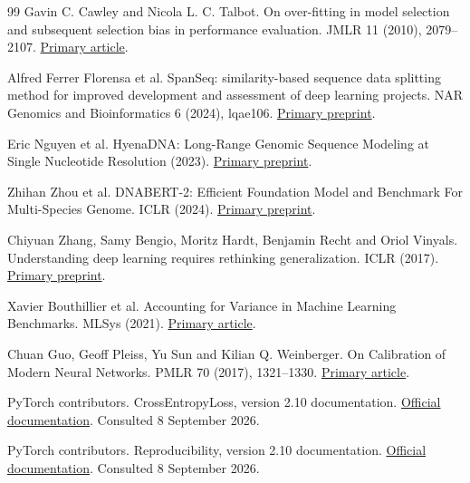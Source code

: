 \begin{thebibliography}{99}
 Gavin C. Cawley and Nicola L. C. Talbot. On over-fitting in model selection and subsequent selection bias in performance evaluation. JMLR 11 (2010), 2079--2107. \href{https://jmlr.org/papers/v11/cawley10a.html}{Primary article}.

 Alfred Ferrer Florensa et al. SpanSeq: similarity-based sequence data splitting method for improved development and assessment of deep learning projects. NAR Genomics and Bioinformatics 6 (2024), lqae106. \href{https://arxiv.org/html/2402.14482v1}{Primary preprint}.

 Eric Nguyen et al. HyenaDNA: Long-Range Genomic Sequence Modeling at Single Nucleotide Resolution (2023). \href{https://arxiv.org/abs/2306.15794}{Primary preprint}.

 Zhihan Zhou et al. DNABERT-2: Efficient Foundation Model and Benchmark For Multi-Species Genome. ICLR (2024). \href{https://arxiv.org/abs/2306.15006}{Primary preprint}.

 Chiyuan Zhang, Samy Bengio, Moritz Hardt, Benjamin Recht and Oriol Vinyals. Understanding deep learning requires rethinking generalization. ICLR (2017). \href{https://arxiv.org/abs/1611.03530v2}{Primary preprint}.

 Xavier Bouthillier et al. Accounting for Variance in Machine Learning Benchmarks. MLSys (2021). \href{https://proceedings.mlsys.org/paper_files/paper/2021/file/0184b0cd3cfb185989f858a1d9f5c1eb-Paper.pdf}{Primary article}.

 Chuan Guo, Geoff Pleiss, Yu Sun and Kilian Q. Weinberger. On Calibration of Modern Neural Networks. PMLR 70 (2017), 1321--1330. \href{https://proceedings.mlr.press/v70/guo17a.html}{Primary article}.

 PyTorch contributors. CrossEntropyLoss, version 2.10 documentation. \href{https://docs.pytorch.org/docs/2.10/generated/torch.nn.CrossEntropyLoss.html}{Official documentation}. Consulted 8 September 2026.

 PyTorch contributors. Reproducibility, version 2.10 documentation. \href{https://docs.pytorch.org/docs/2.10/notes/randomness.html}{Official documentation}. Consulted 8 September 2026.

\end{thebibliography}
